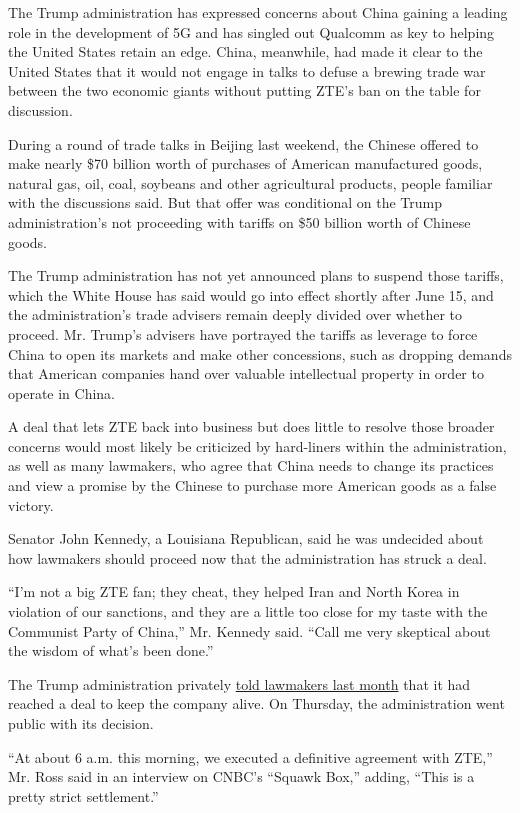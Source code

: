 The Trump administration has expressed concerns about China gaining a
leading role in the development of 5G and has singled out Qualcomm as
key to helping the United States retain an edge. China, meanwhile, had
made it clear to the United States that it would not engage in talks to
defuse a brewing trade war between the two economic giants without
putting ZTE's ban on the table for discussion.

During a round of trade talks in Beijing last weekend, the Chinese
offered to make nearly \$70 billion worth of purchases of American
manufactured goods, natural gas, oil, coal, soybeans and other
agricultural products, people familiar with the discussions said. But
that offer was conditional on the Trump administration's not proceeding
with tariffs on \$50 billion worth of Chinese goods.

The Trump administration has not yet announced plans to suspend those
tariffs, which the White House has said would go into effect shortly
after June 15, and the administration's trade advisers remain deeply
divided over whether to proceed. Mr. Trump's advisers have portrayed the
tariffs as leverage to force China to open its markets and make other
concessions, such as dropping demands that American companies hand over
valuable intellectual property in order to operate in China.

A deal that lets ZTE back into business but does little to resolve those
broader concerns would most likely be criticized by hard-liners within
the administration, as well as many lawmakers, who agree that China
needs to change its practices and view a promise by the Chinese to
purchase more American goods as a false victory.

Senator John Kennedy, a Louisiana Republican, said he was undecided
about how lawmakers should proceed now that the administration has
struck a deal.

``I'm not a big ZTE fan; they cheat, they helped Iran and North Korea in
violation of our sanctions, and they are a little too close for my taste
with the Communist Party of China,'' Mr. Kennedy said. ``Call me very
skeptical about the wisdom of what's been done.''

The Trump administration privately
\href{https://www.nytimes.com/2018/05/25/us/politics/trump-trade-zte.html}{told
lawmakers last month} that it had reached a deal to keep the company
alive. On Thursday, the administration went public with its decision.

``At about 6 a.m. this morning, we executed a definitive agreement with
ZTE,'' Mr. Ross said in an interview on CNBC's ``Squawk Box,'' adding,
``This is a pretty strict settlement.''


